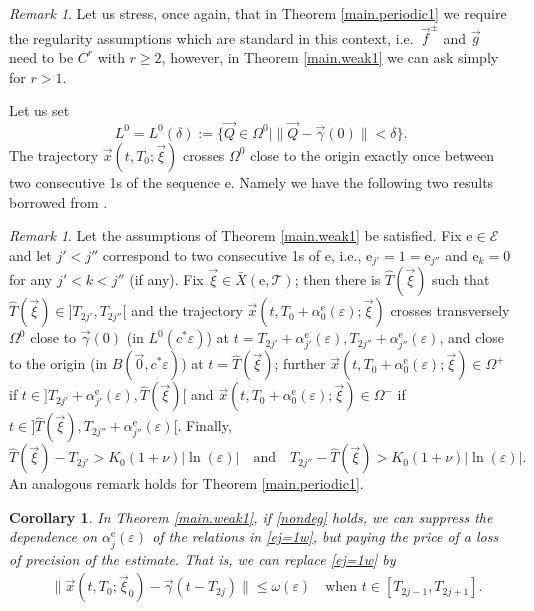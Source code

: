 \documentclass[10pt]{article}
\numberwithin{equation}{section}
\def\al{\alpha}
\def\ga{\vec{\gamma}}
\def\ep{\varepsilon}
\def\Om{\Omega}
\def\ee{{\mathrm e}}
\def\EE{{\mathcal E}}
\def\xxi{\vec{\xi}}
\def\x{\vec{x}}
\def\f{\vec{f}}
\def\g{\vec{g}}
\newtheorem{cor}[theorem]{Corollary}
\theoremstyle{definition}
\theoremstyle{remark}
\newtheorem{remark}[theorem]{Remark}
\begin{document}
\begin{remark}\label{regularity2}
Let us stress, once again, that in Theorem \ref{main.periodic1}  we require the  regularity assumptions which are
standard in this
context, i.e.\ $\f^{\pm}$ and $\g$ need to be $C^r$ with $r \ge 2$, however, in Theorem \ref{main.weak1}  we can ask
simply for  $r>1$.
\end{remark}



Let us set
\begin{equation}\label{L0bis}
 L^0 =  L^0(\delta)  := \{ \vec{Q} \in \Omega^0 \mid \|\vec{Q}- \ga(0) \| <\delta \}.
\end{equation}
The trajectory
$\x(t, T_0; \xxi )$ crosses $\Om^0$ close to the origin exactly once between   two consecutive 1s of the sequence $\ee$. Namely we have the
following  two results borrowed from \cite{CFPrestate}.
\begin{remark}\label{consecutive}
 Let  the assumptions of Theorem \ref{main.weak1}  be satisfied.
Fix $\ee \in \EE$ and let $j'<j''$ correspond to two consecutive 1s of $\ee$, i.e., $\ee_{j'}=1=\ee_{j''}$ and $\ee_k=0$ for any $j'<k<j''$
(if any).
Fix $\xxi \in \bar{X}(\ee, \mathcal{T})$; then there is  $\hat{T}(\xxi)$ such that
  $\hat{T}(\xxi) \in ]T_{2j'},T_{2j''}[$ and
the trajectory $\x(t, T_0+\alpha_0^{\ee}(\ep); \xxi)$
crosses transversely $\Om^0$ close to $\ga(0)$ (in $L^0(c^* \ep)$)
at $t= T_{2j'}+\alpha_{j'}^{\ee}(\ep), T_{2j''}+\alpha_{j''}^{\ee}(\ep)$, and close to the origin
(in $B(\vec{0},c^*\ep)$) at $t=\hat{T}(\xxi)$; further $\x(t, T_0+\alpha_0^{\ee}(\ep); \xxi ) \in \Om^+$ if $t \in
]T_{2j'}+\alpha_{j'}^{\ee}(\ep), \hat{T}(\xxi)[$ and
$\x(t, T_0+\alpha_{0}^{\ee}(\ep); \xxi ) \in \Om^-$ if $t \in ]\hat{T}(\xxi),T_{2j''}+\alpha_{j''}^{\ee}(\ep)[$.
Finally,
$$ \hat{T}(\xxi)-T_{2j'}>  K_0 (1+\nu) |\ln(\ep)| \quad \text{and} \quad T_{2j''}-\hat{T}(\xxi) >  K_0 (1+\nu)
|\ln(\ep)| .$$
An analogous remark holds for Theorem   \ref{main.periodic1}.
\end{remark}



\begin{cor}\label{r.all}
In Theorem \ref{main.weak1}, if \eqref{nondeg} holds, we can suppress the dependence on $\al_j^{\ee}(\ep)$  of the
relations in \eqref{ej=1w},
but paying the price of a loss of precision of the estimate. That is,  we can replace
\eqref{ej=1w}  by
	\begin{equation}\label{ej=1w.all}
	\begin{split}
	&   \|\x(t,T_0; \xxi_0)-\ga(t-T_{2j}) \| \le \omega(\ep) \quad \textrm{when $t \in [T_{2j-1}, T_{2j+1} ]$.}
	\end{split}
	\end{equation}
\end{cor}
\end{document}
